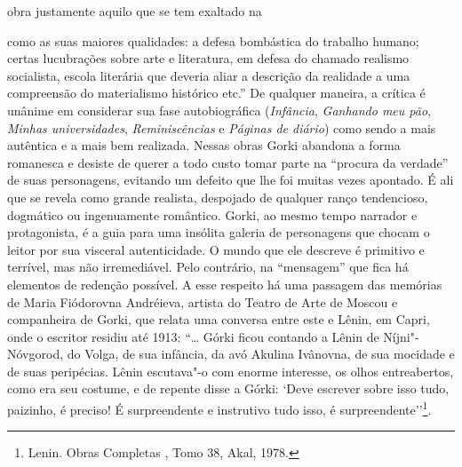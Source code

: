 obra justamente aquilo que se tem exaltado na { como as suas maiores
qualidades: a defesa bombástica do trabalho humano; certas lucubrações
sobre arte e literatura, em defesa do chamado realismo socialista,
escola literária que deveria aliar a descrição da realidade a uma
compreensão do materialismo histórico etc.'' De qualquer maneira, a
crítica é unânime em considerar sua fase autobiográfica
(\emph{Infância}, \emph{Ganhando meu pão}, \emph{Minhas universidades},
\emph{Reminiscências} e \emph{Páginas de diário}) como sendo a mais
autêntica e a mais bem realizada. Nessas obras Gorki abandona a forma
romanesca e desiste de querer a todo custo tomar parte na ``procura da
verdade'' de suas personagens, evitando um defeito que lhe foi muitas
vezes apontado. É ali que se revela como grande realista, despojado de
qualquer ranço tendencioso, dogmático ou ingenuamente romântico. Gorki,
ao mesmo tempo narrador e protagonista, é a guia para uma insólita
galeria de personagens que chocam o leitor por sua visceral
autenticidade. O mundo que ele descreve é primitivo e terrível, mas não
irremediável. Pelo contrário, na ``mensagem'' que fica há elementos de
redenção possível. A esse respeito há uma passagem das memórias de Maria
Fiódorovna Andréieva, artista do Teatro de Arte de Moscou e companheira
de Gorki, que relata uma conversa entre este e Lênin, em Capri, onde o
escritor residiu até 1913: ``\ldots{} Górki ficou contando a Lênin de
Níjni"-Nóvgorod, do Volga, de sua infância, da avó Akulina Ivânovna, de
sua mocidade e de suas peripécias. Lênin escutava"-o com enorme
interesse, os olhos entreabertos, como era seu costume, e de repente
disse a Górki: ‘Deve escrever sobre isso tudo, paizinho, é preciso! É
surpreendente e instrutivo tudo isso, é surpreendente’'\footnote{Lenin. Obras
  Completas , Tomo 38, Akal, 1978.}.

}
